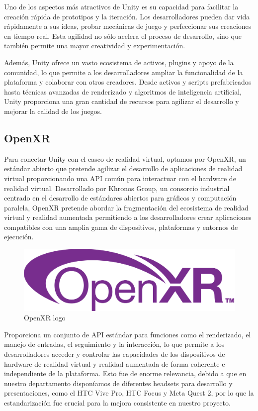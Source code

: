 Uno de los aspectos más atractivos de Unity es su capacidad para facilitar la creación rápida de prototipos y la iteración. Los desarrolladores pueden dar vida rápidamente a sus ideas, probar mecánicas de juego y perfeccionar sus creaciones en tiempo real. Esta agilidad no sólo acelera el proceso de desarrollo, sino que también permite una mayor creatividad y experimentación.

Además, Unity ofrece un vasto ecosistema de activos, plugins y apoyo de la comunidad, lo que permite a los desarrolladores ampliar la funcionalidad de la plataforma y colaborar con otros creadores. Desde activos y scripts prefabricados hasta técnicas avanzadas de renderizado y algoritmos de inteligencia artificial, Unity proporciona una gran cantidad de recursos para agilizar el desarrollo y mejorar la calidad de los juegos.

\subsection{OpenXR}

Para conectar Unity con el casco de realidad virtual, optamos por OpenXR, un estándar abierto que pretende agilizar el desarrollo de aplicaciones de realidad virtual proporcionando una API común para interactuar con el hardware de realidad virtual. Desarrollado por Khronos Group, un consorcio industrial centrado en el desarrollo de estándares abiertos para gráficos y computación paralela, OpenXR pretende abordar la fragmentación del ecosistema de realidad virtual y realidad aumentada permitiendo a los desarrolladores crear aplicaciones compatibles con una amplia gama de dispositivos, plataformas y entornos de ejecución. \cite[]{OpenXR}

\begin{figure}[ht]
   \begin{center}
      \includegraphics[width=0.4\linewidth]{chapter2/figures/OpenXR_logo.png}
   \end{center}
   \caption[OpenXR logo]
   {\footnotesize OpenXR logo}
   \label{fig:mufigure8}
\end{figure}

Proporciona un conjunto de API estándar para funciones como el renderizado, el manejo de entradas, el seguimiento y la interacción, lo que permite a los desarrolladores acceder y controlar las capacidades de los dispositivos de hardware de realidad virtual y realidad aumentada de forma coherente e independiente de la plataforma.
Esto fue de enorme relevancia, debido a que en nuestro departamento disponíamos de diferentes headsets para desarrollo y presentaciones, como el HTC Vive Pro, HTC Focus y Meta Quest 2, por lo que la estandarización fue crucial para la mejora consistente en nuestro proyecto.

